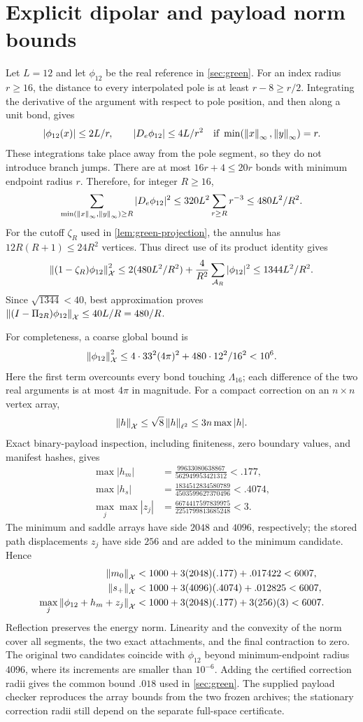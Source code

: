 \section{Explicit dipolar and payload norm bounds}\label{app:green-inputs}

Let $L=12$ and let $\phi_{12}$ be the real reference in
\cref{sec:green}. For an index radius $r\ge16$, the distance to every
interpolated pole is at least $r-8\ge r/2$. Integrating the derivative
of the argument with respect to pole position, and then along a unit
bond, gives
\[
 |\phi_{12}(x)|\le2L/r,\qquad
 |D_e\phi_{12}|\le4L/r^2
 \quad\text{if }\min(\left\lVert x\right\rVert_\infty,\left\lVert y\right\rVert_\infty)=r.
\]
These integrations take place away from the pole segment, so they do not
introduce branch jumps. There are at most $16r+4\le20r$ bonds with
minimum endpoint radius $r$. Therefore, for integer $R\ge16$,
\[
 \sum_{\min(\left\lVert x\right\rVert_\infty,\left\lVert y\right\rVert_\infty)\ge R}
 |D_e\phi_{12}|^2
 \le320L^2\sum_{r\ge R}r^{-3}\le480L^2/R^2.
\]
For the cutoff $\zeta_R$ used in \cref{lem:green-projection}, the
annulus has $12R(R+1)\le24R^2$ vertices. Thus direct use of its product
identity gives
\[
 \left\lVert(1-\zeta_R)\phi_{12}\right\rVert_\mathcal X^2
 \le2(480L^2/R^2)+\frac4{R^2}
           \sum_{\mathcal A_R}|\phi_{12}|^2
 \le1344L^2/R^2.
\]
Since $\sqrt{1344}<40$, best approximation proves
$\left\lVert(I-\Pi_{2R})\phi_{12}\right\rVert_\mathcal X\le40L/R=480/R$.

For completeness, a coarse global bound is
\[
 \left\lVert\phi_{12}\right\rVert_\mathcal X^2
 \le4\cdot33^2(4\pi)^2+480\cdot12^2/16^2<10^6.
\]
Here the first term overcounts every bond touching $\Lambda_{16}$;
each difference of the two real arguments is at most $4\pi$ in
magnitude. For a compact correction on an $n\times n$ vertex array,
\[
 \left\lVert h\right\rVert_\mathcal X\le\sqrt8\left\lVert h\right\rVert_{\ell^2}\le3n\max|h|.
\]
Exact binary-payload inspection, including finiteness, zero boundary
values, and manifest hashes, gives
\begin{align*}
 \max|h_m|&=\frac{99633080638867}{562949953421312}<.177,\\
 \max|h_s|&=\frac{1834512834580789}{4503599627370496}<.4074,\\
 \max_j\max|z_j|&=\frac{6674417597839975}{2251799813685248}<3.
\end{align*}
The minimum and saddle arrays have side $2048$ and $4096$, respectively;
the stored path displacements $z_j$ have side $256$ and are added to the
minimum candidate. Hence
\begin{align*}
 \left\lVert m_0\right\rVert_\mathcal X&<1000+3(2048)(.177)+.017422<6007,\\
 \left\lVert s_+\right\rVert_\mathcal X&<1000+3(4096)(.4074)+.012825<6007,\\
 \max_j\left\lVert\phi_{12}+h_m+z_j\right\rVert_\mathcal X
   &<1000+3(2048)(.177)+3(256)(3)<6007.
\end{align*}
Reflection preserves the energy norm. Linearity and the convexity of the
norm cover all segments, the two exact attachments, and the final
contraction to zero. The original two candidates coincide with
$\phi_{12}$ beyond minimum-endpoint radius $4096$, where its increments
are smaller than $10^{-6}$. Adding the certified correction radii gives
the common bound $.018$ used in \cref{sec:green}.
The supplied payload checker reproduces the array bounds from the two
frozen archives; the stationary correction radii still depend on the
separate full-space certificate.

